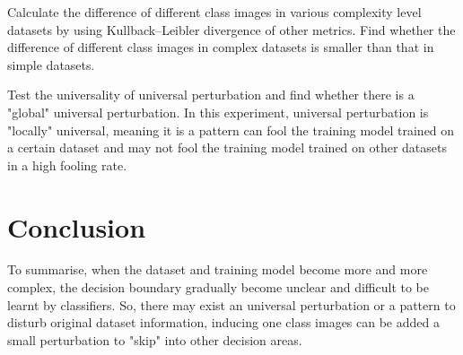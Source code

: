 \documentclass{article}
\begin{document}
Calculate the difference of different class images in various complexity level datasets by using Kullback–Leibler divergence of other metrics. Find whether the difference of different class images in complex datasets is smaller than that in simple datasets. 

Test the universality of universal perturbation and find whether there is a "global" universal perturbation. In this experiment, universal perturbation is "locally" universal, meaning it is a pattern can fool the training model trained on a certain dataset and may not fool the training model trained on other datasets in a high fooling rate.


\section{Conclusion}
To summarise, when the dataset and training model become more and more complex, the decision boundary gradually become unclear and difficult to be learnt by classifiers. So, there may exist an universal perturbation or a pattern to disturb original dataset information, inducing one class images can be added a small perturbation to "skip" into other decision areas.




\nocite{*}



\end{document}
